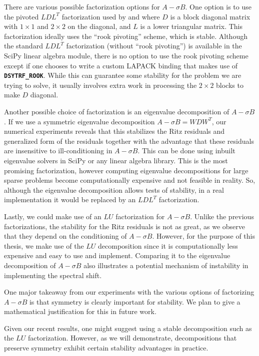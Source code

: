 There are various possible factorization options for $A-\sigma B$. One option is to use the pivoted $LDL^{T}$ factorization used by \cite{stewart2024spectraltransformationdensesymmetric} and \cite{Ericsson1980TheST} where $D$ is a block diagonal matrix with $1 \times 1$ and $2 \times 2$ on the diagonal, and $L$ is a lower triangular matrix. This factorization ideally uses the ``rook pivoting'' scheme, which is stable. Although the standard $LDL^T$ factorization (without ``rook pivoting'') is available in the SciPy linear algebra module, there is no option to use the rook pivoting scheme except if one chooses to write a custom LAPACK binding that makes use of \textbf{\texttt{DSYTRF\_ROOK}}. While this can guarantee some stability for the problem we are trying to solve, it usually involves extra work in processing the $2 \times 2$ blocks to make $D$ diagonal.

Another possible choice of factorization is an eigenvalue decomposition of $A - \sigma B$. If we use a symmetric eigenvalue decomposition $A- \sigma B = WDW^T$, our numerical experiments reveals that this stabilizes the Ritz residuals and generalized form of the residuals together with the advantage that these residuals are insensitive to ill-conditioning in $A-\sigma B$. This can be done using inbuilt eigenvalue solvers in SciPy or any linear algebra library. This is the most promising factorization, however computing eigenvalue decompositions for large sparse problems become computationally expensive and not feasible in reality. So, although the eigenvalue decomposition allows tests of stability, in a real implementation it would be replaced by an $LDL^T$ factorization.

Lastly, we could make use of an $LU$ factorization for $A-\sigma B$. Unlike the previous factorizations, the stability for the Ritz residuals is not as great, as we observe that they depend on the conditioning of $A-\sigma B$.  However, for the purpose of this thesis, we make use of the $LU$ decomposition since it is computationally less expensive and easy to use and implement. Comparing it to the eigenvalue decomposition of $A-\sigma B$ also illustrates a potential mechanism of instability in implementing the spectral shift.

One major takeaway from our experiments with the various options of factorizing $A-\sigma B$ is that symmetry is clearly important for stability. We plan to give a mathematical justification for this in future work.

Given our recent results, one might suggest using a stable decomposition such as the $LU$ factorization. However, as we will demonstrate, decompositions that preserve symmetry exhibit certain stability advantages in practice.

